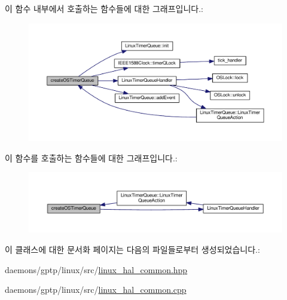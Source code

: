 이 함수 내부에서 호출하는 함수들에 대한 그래프입니다.\+:
\nopagebreak
\begin{figure}[H]
\begin{center}
\leavevmode
\includegraphics[width=350pt]{class_linux_timer_queue_factory_a18fa037972106a1baf8f14d61d64dc81_cgraph}
\end{center}
\end{figure}




이 함수를 호출하는 함수들에 대한 그래프입니다.\+:
\nopagebreak
\begin{figure}[H]
\begin{center}
\leavevmode
\includegraphics[width=350pt]{class_linux_timer_queue_factory_a18fa037972106a1baf8f14d61d64dc81_icgraph}
\end{center}
\end{figure}




이 클래스에 대한 문서화 페이지는 다음의 파일들로부터 생성되었습니다.\+:\begin{DoxyCompactItemize}
\item 
daemons/gptp/linux/src/\hyperlink{linux__hal__common_8hpp}{linux\+\_\+hal\+\_\+common.\+hpp}\item 
daemons/gptp/linux/src/\hyperlink{linux__hal__common_8cpp}{linux\+\_\+hal\+\_\+common.\+cpp}\end{DoxyCompactItemize}
